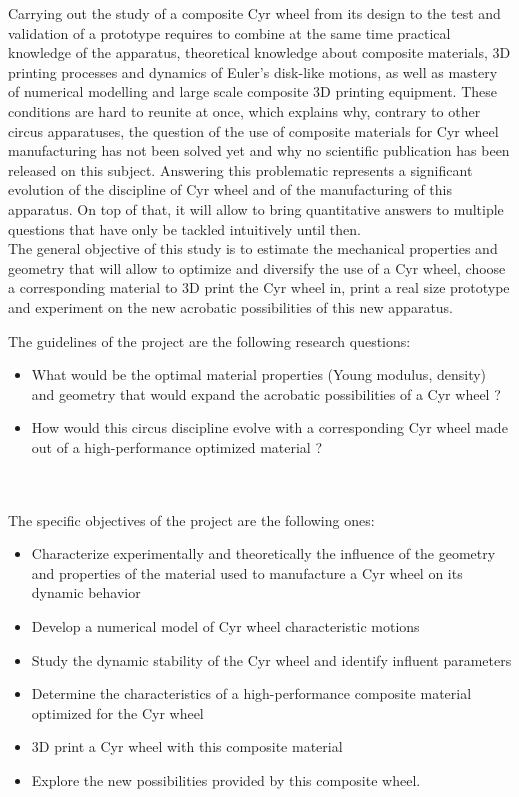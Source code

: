 Carrying out the study of a composite Cyr wheel from its design to the test and validation of a prototype requires to combine at the same time practical knowledge of the apparatus, theoretical knowledge about composite materials, 3D printing processes and dynamics of Euler’s disk-like motions, as well as mastery of numerical modelling and large scale composite 3D printing equipment. These conditions are hard to reunite at once, which explains why, contrary to other circus apparatuses, the question of the use of composite materials for Cyr wheel manufacturing has not been solved yet and why no scientific publication has been released on this subject. Answering this problematic represents a significant evolution of the discipline of Cyr wheel and of the manufacturing of this apparatus. On top of that, it will allow to bring quantitative answers to multiple questions that have only be tackled intuitively until then.\\
The general objective of this study is to estimate the mechanical properties and geometry that will allow to optimize and diversify the use of a Cyr wheel, choose a corresponding material to 3D print the Cyr wheel in, print a real size prototype and experiment on the new acrobatic possibilities of this new apparatus.

The guidelines of the project are the following research questions:
\begin{itemize}
\item What would be the optimal material properties (Young modulus, density) and geometry that would expand the acrobatic possibilities of a Cyr wheel ? 
\item	How would this circus discipline evolve with a corresponding Cyr wheel made out of a high-performance optimized material ? 
\end{itemize}
\\
\\
The specific objectives of the project are the following ones:
\begin{itemize}
\item Characterize experimentally and theoretically the influence of the geometry and properties of the material used to manufacture a Cyr wheel on its dynamic behavior
\item Develop a numerical model of Cyr wheel characteristic motions
\item Study the dynamic stability of the Cyr wheel and identify influent parameters
\item	Determine the characteristics of a high-performance composite material optimized for the Cyr wheel 
\item	3D print a Cyr wheel with this composite material 
\item	Explore the new possibilities provided by this composite wheel.
\end{itemize}
\\

